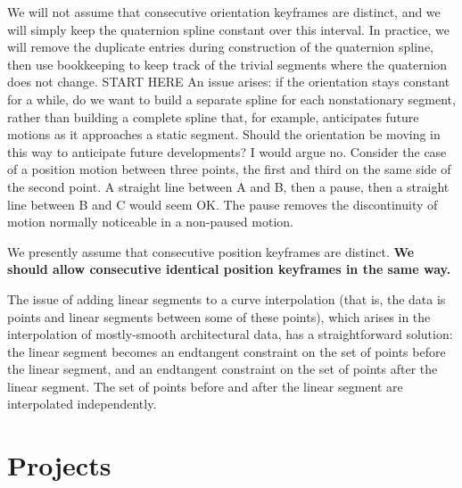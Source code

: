 \documentclass[12pt]{article}
\begin{document}
We will not assume that consecutive orientation keyframes are distinct,
and we will simply keep the quaternion spline constant over this interval.
In practice, we will remove the duplicate entries during construction 
of the quaternion spline, then use bookkeeping to keep track of the 
trivial segments where the quaternion does not change.
START HERE
An issue arises: if the orientation stays constant for a while, do we want
to build a separate spline for each nonstationary segment, rather than building
a complete spline that, for example, anticipates future motions as it approaches
a static segment.
Should the orientation be moving in this way to anticipate future developments?
I would argue no.
Consider the case of a position motion between three points, the first and third on
the same side of the second point.
A straight line between A and B, then a pause, then a straight line between B and C
would seem OK.
The pause removes the discontinuity of motion normally noticeable in a non-paused motion.

We presently assume that consecutive position keyframes are distinct.
{\bf We should allow consecutive identical position keyframes in the same way.}

The issue of adding linear segments to a curve interpolation
(that is, the data is points and linear segments between some of these points),
which arises in the interpolation of mostly-smooth architectural data,
has a straightforward solution: the linear segment becomes an endtangent constraint
on the set of points before the linear segment, and an endtangent constraint
on the set of points after the linear segment.
The set of points before and after the linear segment are interpolated independently.

\clearpage

\section{Projects}
\end{document}
